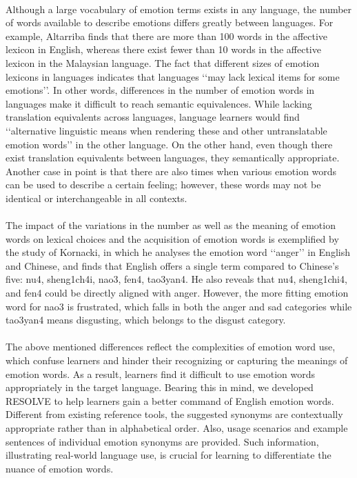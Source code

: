 \documentclass[a4paper,12pt,oneside]{article}
\begin{document}
\paragraph{}
Although a large vocabulary of emotion terms exists in any language, the number of words available to describe emotions differs greatly between languages. For example, Altarriba finds that there are more than 100 words in the affective lexicon in English, whereas there exist fewer than 10 words in the affective lexicon in the Malaysian language. The fact that different sizes of emotion lexicons in languages indicates that languages ‘‘may lack lexical items for some emotions’’. In other words, differences in the number of emotion words in languages make it difficult to reach semantic equivalences. While lacking translation equivalents across languages, language learners would find ‘‘alternative linguistic means when rendering these and other untranslatable emotion words’’ in the other language. On the other hand, even though there exist translation equivalents between languages, they semantically appropriate. Another case in point is that there are also times when various emotion words can be used to describe a certain feeling; however, these words may not be identical or interchangeable in all contexts.
\paragraph{}
The impact of the variations in the number as well as the meaning of emotion words on lexical choices and the acquisition of emotion words is exemplified by the study of Kornacki, in which he analyses the emotion word ‘‘anger’’ in English and Chinese, and finds that English offers a single term compared to Chinese’s five: nu4, sheng1ch4i, nao3, fen4, tao3yan4. He also reveals that nu4, sheng1chi4, and fen4 could be directly aligned with anger. However, the more fitting emotion word for nao3 is frustrated, which falls in both the anger and sad categories while tao3yan4 means disgusting, which belongs to the disgust category. 
\paragraph{}
The above mentioned differences reflect the complexities of emotion word use, which confuse learners and hinder their recognizing or capturing the meanings of emotion words. As a result, learners find it difficult to use emotion words appropriately in the target language. Bearing this in mind, we developed RESOLVE to help learners gain a better command of English emotion words. Different from existing reference tools, the suggested synonyms are contextually appropriate rather than in alphabetical order. Also, usage scenarios and example sentences of individual emotion synonyms are provided. Such information, illustrating real-world language use, is crucial for learning to differentiate the nuance of emotion words. 
\end{document}
